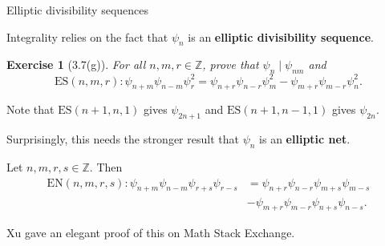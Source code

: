 \documentclass[10pt]{beamer}
\newtheorem{exercise}{Exercise}
\begin{document}
\begin{frame}[t]{Elliptic divisibility sequences}

Integrality relies on the fact that $ \psi_n $ is an \textbf{elliptic divisibility sequence}.

\begin{exercise}[3.7(g)]
For all $ n, m, r \in \mathbb{Z} $, prove that $ \psi_n \mid \psi_{nm} $ and
$$ \mathrm{ES}(n, m, r) : \psi_{n + m}\psi_{n - m}\psi_r^2 = \psi_{n + r}\psi_{n - r}\psi_m^2 - \psi_{m + r}\psi_{m - r}\psi_n^2. $$
\end{exercise}

Note that $ \mathrm{ES}(n + 1, n, 1) $ gives $ \psi_{2n + 1} $ and $ \mathrm{ES}(n + 1, n - 1, 1) $ gives $ \psi_{2n} $.

\pause

\vspace{0.5cm} Surprisingly, this needs the stronger result that $ \psi_n $ is an \textbf{elliptic net}.

\begin{theorem}[Xu]
Let $ n, m, r, s \in \mathbb{Z} $. Then
\begin{align*}
\mathrm{EN}(n, m, r, s) : \psi_{n + m}\psi_{n - m}\psi_{r + s}\psi_{r - s}
& = \psi_{n + r}\psi_{n - r}\psi_{m + s}\psi_{m - s} \\
& - \psi_{m + r}\psi_{m - r}\psi_{n + s}\psi_{n - s}.
\end{align*}
\end{theorem}

Xu gave an elegant proof of this on Math Stack Exchange.

\end{frame}
\end{document}
